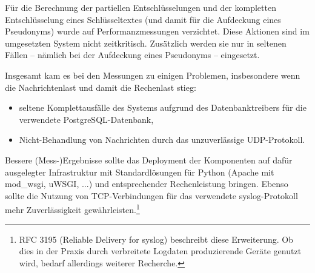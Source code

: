 Für die Berechnung der partiellen Entschlüsselungen und der kompletten Entschlüsselung eines Schlüsseltextes (und damit für die Aufdeckung eines Pseudonyms) wurde auf Performanzmessungen verzichtet. Diese Aktionen sind im umgesetzten System nicht zeitkritisch. Zusätzlich werden sie nur in seltenen Fällen -- nämlich bei der Aufdeckung eines Pseudonyms -- eingesetzt.

Insgesamt kam es bei den Messungen zu einigen Problemen, insbesondere wenn die Nachrichtenlast und damit die Rechenlast stieg:
\begin{itemize}
\item seltene Komplettausfälle des Systems aufgrund des Datenbanktreibers für die verwendete PostgreSQL-Datenbank,
\item Nicht-Behandlung von Nachrichten durch das unzuverlässige UDP-Protokoll.
\end{itemize}
Bessere (Mess-)Ergebnisse sollte das Deployment der Komponenten auf dafür ausgelegter Infrastruktur mit Standardlösungen für Python (Apache mit mod\_wsgi, uWSGI, ...) und entsprechender Rechenleistung bringen. Ebenso sollte die Nutzung von TCP-Verbindungen für das verwendete syslog-Protokoll mehr Zuverlässigkeit gewährleisten.\footnote{
  RFC 3195 (Reliable Delivery for syslog) beschreibt diese Erweiterung. Ob dies in der Praxis durch verbreitete Logdaten produzierende Geräte genutzt wird, bedarf allerdings weiterer Recherche.
}

